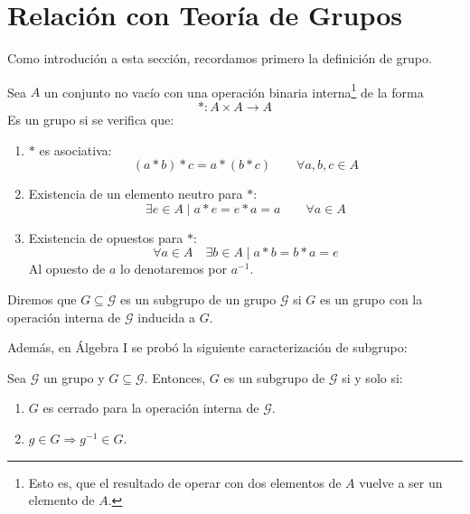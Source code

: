 \section{Relación con Teoría de Grupos}
Como introdución a esta sección, recordamos primero la definición de grupo.
\begin{definicion}[Grupo]
    Sea $A$ un conjunto no vacío con una operación binaria interna\footnote{Esto es, que el resultado de operar con dos elementos de $A$ vuelve a ser un elemento de $A$.} de la forma
\begin{equation*}
    \ast:A\times A\rightarrow A
\end{equation*}
Es un grupo si se verifica que:
\begin{enumerate}[label=(\arabic*)]
    \item $\ast$ es asociativa: 
        \begin{equation*}
            (a\ast b)\ast c = a\ast (b\ast c) \qquad \forall a,b,c\in A
        \end{equation*}
    \item Existencia de un elemento neutro para $\ast$:
        \begin{equation*}
            \exists e\in A \mid a\ast e = e\ast a = a \qquad \forall a\in A
        \end{equation*}
    \item Existencia de opuestos para $\ast$:
        \begin{equation*}
            \forall a\in A \quad \exists b\in A \mid a\ast b = b\ast a = e
        \end{equation*}
        Al opuesto de $a$ lo denotaremos por $a^{-1}$.
\end{enumerate}
\end{definicion}

\begin{definicion}
    Diremos que $G\subseteq  \mathcal{G}$ es un subgrupo de un grupo $\mathcal{G}$ si $G$ es un grupo con la operación interna de $\mathcal{G}$ inducida a $G$.
\end{definicion}
Además, en Álgebra I se probó la siguiente caracterización de subgrupo:
\begin{prop}
    Sea $\mathcal{G}$ un grupo y $G\subseteq \mathcal{G}$. Entonces, $G$ es un subgrupo de $\mathcal{G}$ si y solo si:
    \begin{enumerate}
        \item $G$ es cerrado para la operación interna de $\mathcal{G}$.
        \item $g\in G \Longrightarrow g^{-1} \in G$.
    \end{enumerate}
\end{prop}

